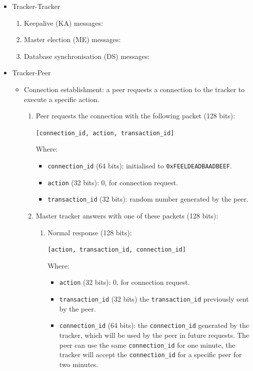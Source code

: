 \documentclass[twoside,a4paper,10pt]{article}
\begin{document}
\begin{itemize}
\item Tracker-Tracker
  \begin{enumerate}
  \item Keepalive (KA) messages:
  \item Master election (ME) messages:
  \item Database synchronisation (DS) messages:
  \end{enumerate}
\item Tracker-Peer
  \begin{itemize}
  \item Connection establishment: a peer requests a
    connection to the tracker to execute a specific action.

    \begin{enumerate}
    \item Peer requests the connection with the following packet (128 bits):

      \texttt{[connection\_id, action, transaction\_id]}
      
      Where:
      \begin{itemize}
      \item \texttt{connection\_id} (64 bits): initialised to
        \texttt{0xFEELDEADBAADBEEF}.
      \item \texttt{action} (32 bits): 0, for connection request.
      \item \texttt{transaction\_id} (32 bits): random number generated by the
        peer.
      \end{itemize}
    \item Master tracker answers with one of these packets (128 bits):
      \begin{enumerate}  

      \item Normal response (128 bits):
        
        \texttt{[action, transaction\_id, connection\_id]}

        Where:  
        \begin{itemize}
        \item \texttt{action} (32 bits): 0, for connection request.
        \item \texttt{transaction\_id} (32 bits)
          the \texttt{transaction\_id} previously sent by the peer.
        \item \texttt{connection\_id} (64 bits):
          the \texttt{connection\_id} generated by the tracker, which will be
          used by the peer in future requests. The peer can use the same
          \texttt{connection\_id} for one minute, the tracker will accept the
          \texttt{connection\_id} for a specific peer for two minutes.
        \end{itemize}


\end{enumerate}
\end{enumerate}
\end{itemize}
\end{itemize}
\end{document}
